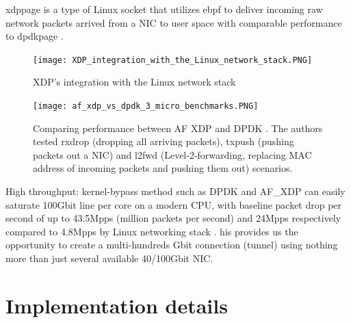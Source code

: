 \ac{xdppage} is a type of Linux socket that utilizes \ac{ebpf} to deliver incoming raw network packets arrived from a \ac{NIC} to user space with comparable performance to \ac{dpdkpage} \cite{karlsson_path_to_dpdk_speednodate}.

\begin{figure}[H]
	\centering
	\texttt{[image: XDP\_integration\_with\_the\_Linux\_network\_stack.PNG]}
	\caption{XDP’s integration with the Linux network stack \cite{hoiland_jorgensen_express_2018}}\label{fig:approach_design:xdp_architecture}
\end{figure}

\begin{figure}[H]
	\centering
	\texttt{[image: af\_xdp\_vs\_dpdk\_3\_micro\_benchmarks.PNG]}
	\caption{Comparing performance between AF XDP and DPDK \cite{karlsson_path_to_dpdk_speednodate}. The authors tested  rxdrop (dropping all arriving packets), txpush (pushing packets out a NIC) and l2fwd (Level-2-forwarding, replacing MAC address of incoming packets and pushing them out) scenarios.}\label{fig:approach_design:af_xdp_vs_dpdk_3_micro_benchmarks}
\end{figure}

High throughput: kernel-bypass method such as DPDK and AF\_XDP can easily saturate 100Gbit line per core on a modern CPU, with baseline packet drop per second of up to 43.5Mpps (million packets per second) and 24Mpps respectively compared to 4.8Mpps by Linux networking stack \cite{hoiland_jorgensen_express_2018} \cite{intel_dpdk_perf}.
his provides us the opportunity to create a multi-hundreds Gbit connection (tunnel) using nothing more than just several available 40/100Gbit NIC.


\section{Implementation details}




